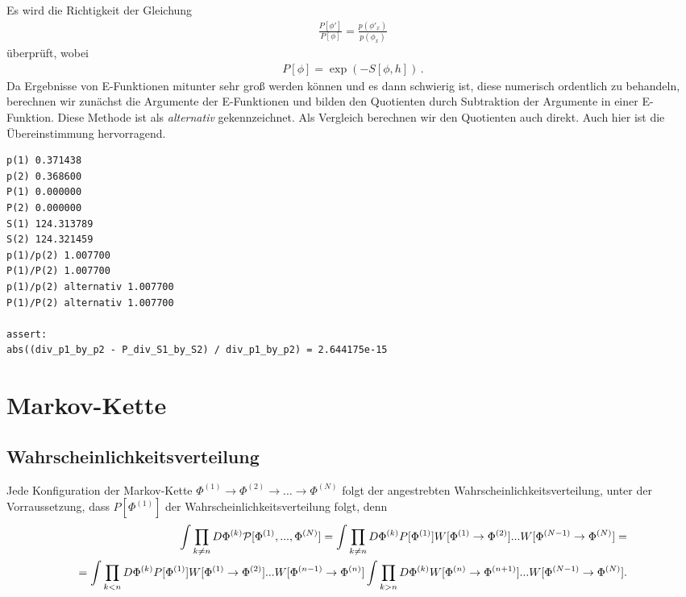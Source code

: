 \documentclass[10pt,a4paper]{article}
\begin{document}
Es wird die Richtigkeit der Gleichung
\begin{align*}
  \frac{P\left[ \phi' \right]}{P\left[ \phi \right]} = \frac{p\left( \phi'_{x} \right)}{p\left( \phi_{x} \right)}
\end{align*}
überprüft, wobei
\begin{align*}
  P\left[ \phi \right] = \exp\left( - S\left[ \phi, h \right] \right)\,.
\end{align*}
Da Ergebnisse von E-Funktionen mitunter sehr groß werden können und es dann
schwierig ist, diese numerisch ordentlich zu behandeln, berechnen wir zunächst
die Argumente der E-Funktionen und bilden den Quotienten durch Subtraktion der
Argumente in einer E-Funktion. Diese Methode ist als \emph{alternativ}
gekennzeichnet. Als Vergleich berechnen wir den Quotienten auch direkt. Auch
hier ist die Übereinstimmung hervorragend.
\begin{verbatim}
p(1) 0.371438
p(2) 0.368600
P(1) 0.000000
P(2) 0.000000
S(1) 124.313789
S(2) 124.321459
p(1)/p(2) 1.007700
P(1)/P(2) 1.007700
p(1)/p(2) alternativ 1.007700
P(1)/P(2) alternativ 1.007700

assert:
abs((div_p1_by_p2 - P_div_S1_by_S2) / div_p1_by_p2) = 2.644175e-15
\end{verbatim}


\section{Markov-Kette}

\subsection{Wahrscheinlichkeitsverteilung}
Jede Konfiguration der Markov-Kette $\Phi^{(1)}\to \Phi^{(2)}\to\dots\to \Phi^{(N)}$
folgt der angestrebten Wahrscheinlichkeitsverteilung, unter der Vorraussetzung,
dass $P[\Phi^{(1)}]$ der Wahrscheinlichkeitsverteilung folgt, denn \\

 \begin{align*}
	\int \prod_{k\neq n} D\Phi^{(k)} {\cal P}[\Phi^{(1)},...,\Phi^{(N)}] = \int \prod_{k\neq n} D\Phi^{(k)}P[\Phi^{(1)}] W[\Phi^{(1)}\to \Phi^{(2)}]...W[\Phi^{(N-1)}\to \Phi^{(N)}]= \\
	=\int \prod_{k <  n} D\Phi^{(k)}P[\Phi^{(1)}] W[\Phi^{(1)}\to \Phi^{(2)}]...W[\Phi^{(n-1)}\to \Phi^{(n)}] \int \prod_{k > n} D\Phi^{(k)} W[\Phi^{(n)}\to \Phi^{(n+1)}]...W[\Phi^{(N-1)}\to \Phi^{(N)}].
 \end{align*}
\end{document}
